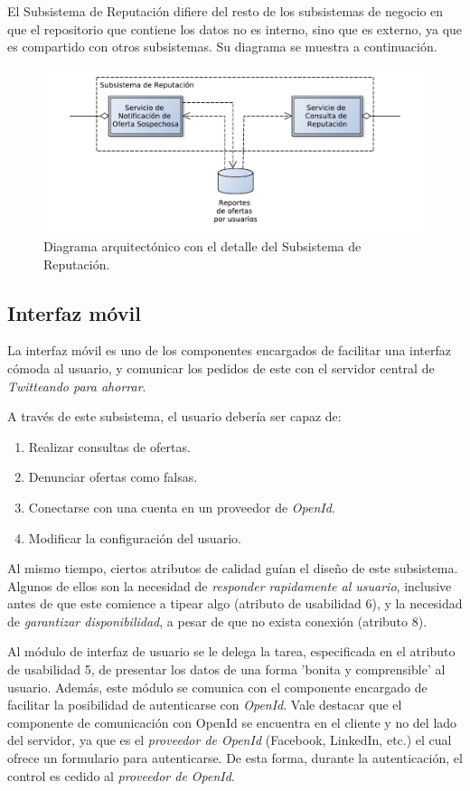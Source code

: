 El \textsf{Subsistema de Reputación} difiere del resto de los subsistemas de negocio en que el repositorio que contiene los datos no es interno, sino que es externo, ya que es compartido con otros subsistemas. Su diagrama se muestra a continuación. 

\begin{figure}[H]
	\centering
	\includegraphics[width=\textwidth]{graficos/arch/subsist_reputacion.pdf}
	\caption{Diagrama arquitectónico con el detalle del \textsf{Subsistema de Reputación}.}
\end{figure}

\subsection{Interfaz móvil}

La interfaz móvil es uno de los componentes encargados de facilitar una interfaz cómoda al usuario, y comunicar los pedidos de este con el servidor central de \emph{Twitteando para ahorrar}.

A través de este subsistema, el usuario debería ser capaz de:
\begin{enumerate}
	\item Realizar consultas de ofertas.
	\item Denunciar ofertas como falsas.
	\item Conectarse con una cuenta en un proveedor de \emph{OpenId}.
	\item Modificar la configuración del usuario.
\end{enumerate}

Al mismo tiempo, ciertos atributos de calidad guían el diseño de este subsistema. Algunos de ellos son la necesidad de \emph{responder rapidamente al usuario}, inclusive antes de que este comience a tipear algo (atributo de usabilidad 6), y la necesidad de \emph{garantizar disponibilidad}, a pesar de que no exista conexión (atributo 8).

Al módulo de interfaz de usuario se le delega la tarea, especificada en el atributo de usabilidad 5, de presentar los datos de una forma 'bonita y comprensible' al usuario. Además, este módulo se comunica con el componente encargado de facilitar la posibilidad de autenticarse con \emph{OpenId}. Vale destacar que el componente de comunicación con OpenId se encuentra en el cliente y no del lado del servidor, ya que es el \emph{proveedor de OpenId} (\textsf{Facebook}, \textsf{LinkedIn}, etc.) el cual ofrece un formulario para autenticarse. De esta forma, durante la autenticación, el control es cedido al \emph{proveedor de OpenId}.

